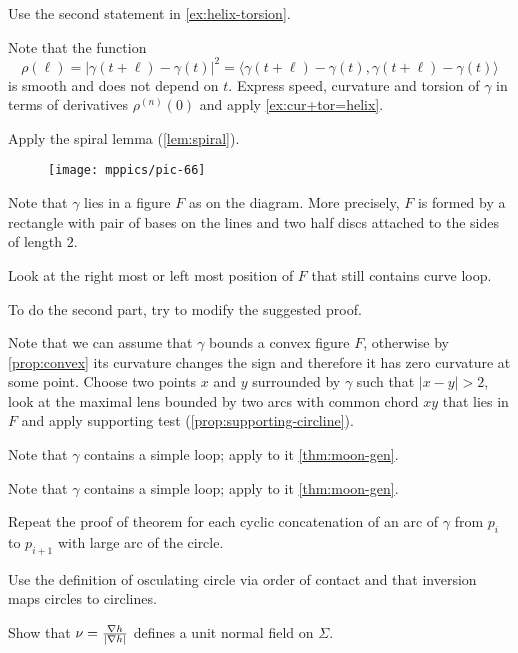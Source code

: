  Use the second statement in \ref{ex:helix-torsion}.

 Note that the function
\[\rho(\ell)=|\gamma(t+\ell)-\gamma(t)|^2=\langle \gamma(t+\ell)-\gamma(t),\gamma(t+\ell)-\gamma(t)\rangle\] 
is smooth and does not depend on $t$.
Express speed, curvature and torsion of $\gamma$ in terms of derivatives $\rho^{(n)}(0)$
and apply \ref{ex:cur+tor=helix}.

 Apply the spiral lemma (\ref{lem:spiral}).

\begin{wrapfigure}{r}{35 mm}
\vskip1mm
\centering
\texttt{[image: mppics/pic-66]}
\vskip0mm
\end{wrapfigure}

Note that $\gamma$ lies in a figure $F$ as on the diagram.
More precisely, $F$ is formed by a rectangle with pair of bases on the lines and two half discs attached to the sides of length $2$.

Look at the right most or left most position of $F$ that still contains curve loop.

To do the second part, try to modify the suggested proof.

Note that we can assume that $\gamma$ bounds a convex figure $F$, otherwise by \ref{prop:convex} its curvature changes the sign and therefore it has zero curvature at some point.
Choose two points $x$ and $y$ surrounded by $\gamma$ such that $|x-y|>2$,
look at the maximal lens bounded by two arcs with common chord $xy$ that lies in $F$ and apply supporting test (\ref{prop:supporting-circline}).

 Note that $\gamma$ contains a simple loop; apply to it \ref{thm:moon-gen}.

 Note that $\gamma$ contains a simple loop; apply to it \ref{thm:moon-gen}.

Repeat the proof of theorem for each cyclic concatenation of an arc of $\gamma$ from $p_i$ to $p_{i+1}$ with large arc of the circle. 

 Use the definition of osculating circle via order of contact and that inversion maps circles to circlines. 

 Show that $\nu=\tfrac{\nabla h}{|\nabla h|}$ defines a unit normal field on $\Sigma$.

